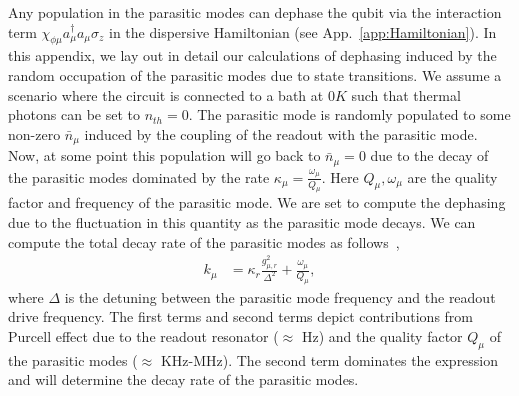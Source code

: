\documentclass[%
reprint,
superscriptaddress,
 amsmath,amssymb,
 aps,
 prx,
longbibliography,
floatfix,
]{revtex4-2}
\begin{document}
Any population in the parasitic modes can dephase the qubit via the interaction term $\chi_{\phi\mu}a_\mu^\dagger a_\mu\sigma_z $ in the dispersive Hamiltonian (see App.~\ref{app:Hamiltonian}). In this appendix, we lay out in detail our calculations of dephasing induced by the random occupation of the parasitic modes due to state transitions. We assume a scenario where the circuit is connected to a bath at $0K$ such that thermal photons can be set to $n_{th}=0$. The parasitic mode is randomly populated to some non-zero $\bar n_\mu$ induced by the coupling of the readout with the parasitic mode. Now, at some point this population will go back to $\bar n_\mu=0$ due to the decay of the parasitic modes dominated by the rate $\kappa_\mu=\frac{\omega_\mu}{Q_\mu}$. Here $Q_\mu,\omega_\mu$ are the quality factor and frequency of the parasitic mode. We are set to compute the dephasing due to the fluctuation in this quantity as the parasitic mode decays. We can compute the total decay rate of the parasitic modes as follows~\cite{gambetta2006qubit}, 
\begin{align}
k_\mu&=\kappa_r \frac{g_{\mu,r}^2}{\Delta^2}+\frac{\omega_\mu}{Q_\mu},
\end{align}
where $\Delta$ is the detuning between the parasitic mode frequency and the readout drive frequency. The first terms and second terms depict contributions from Purcell effect due to the readout resonator ($\approx$ Hz) and the quality factor $Q_\mu$ of the parasitic modes ($\approx$ KHz-MHz). The second term dominates the expression and will determine the decay rate of the parasitic modes. 
 
\end{document}

